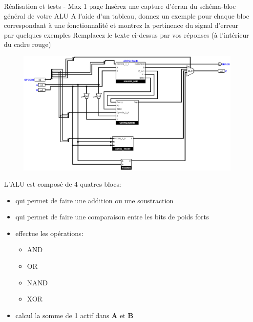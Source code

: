 \documentclass[a4paper]{article}
\begin{document}
\begin{tcolorbox}[colframe=Monokaimagenta,colback=white]
Réalisation et tests - Max 1 page 
Insérez une capture d’écran du schéma-bloc général de votre ALU
A l’aide d’un tableau, donnez un exemple pour chaque bloc correspondant à une fonctionnalité et montrez la pertinence du signal d’erreur par quelques exemples
Remplacez le texte ci-dessus par vos réponses (à l’intérieur du cadre rouge)

\begin{figure}[H]
    \centering
    \includegraphics[width=\textwidth]{src/ALU.png}
    \label{fig:ALU}
\end{figure}

L'ALU est composé de 4 quatres blocs:
\begin{itemize}

\item    {} qui permet de faire une addition ou une soustraction
\item    {} qui permet de faire une comparaison entre les bits de poids forts
\item    {} effectue les opérations:
    \begin{itemize}
        \item     AND
        \item     OR
        \item     NAND
        \item     XOR
    \end{itemize}
\item    {} calcul la somme de 1 actif dans \textbf{A} et \textbf{B}

\end{itemize}


\end{tcolorbox}
\end{document}
